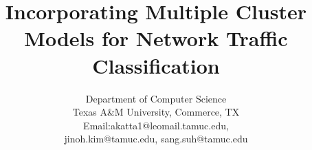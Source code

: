 \documentclass[conference]{IEEEtran}
\begin{document}
%
\title{Incorporating Multiple Cluster Models for Network Traffic Classification}


\author{
	\IEEEauthorblockA
	{Department of Computer Science \\
		Texas A\&M University,
		Commerce, TX\\
		Email:akatta1@leomail.tamuc.edu, \\
		jinoh.kim@tamuc.edu, sang.suh@tamuc.edu}
	\and
}

% 








\maketitle
\end{document}
